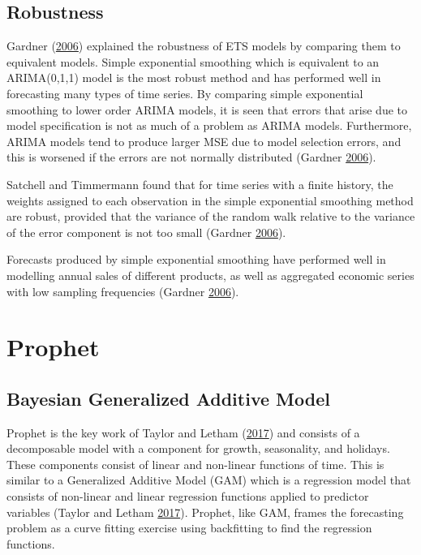 \documentclass[12pt,preprint, authoryear]{elsarticle}
\numberwithin{equation}{section}
\numberwithin{figure}{section}
\numberwithin{table}{section}
\begin{document}
\subsection{Robustness}\label{robustness}

Gardner (\protect\hyperlink{ref-gardner2006exponential}{2006}) explained
the robustness of ETS models by comparing them to equivalent models.
Simple exponential smoothing which is equivalent to an ARIMA(0,1,1)
model is the most robust method and has performed well in forecasting
many types of time series. By comparing simple exponential smoothing to
lower order ARIMA models, it is seen that errors that arise due to model
specification is not as much of a problem as ARIMA models. Furthermore,
ARIMA models tend to produce larger MSE due to model selection errors,
and this is worsened if the errors are not normally distributed (Gardner
\protect\hyperlink{ref-gardner2006exponential}{2006}).

Satchell and Timmermann found that for time series with a finite
history, the weights assigned to each observation in the simple
exponential smoothing method are robust, provided that the variance of
the random walk relative to the variance of the error component is not
too small (Gardner
\protect\hyperlink{ref-gardner2006exponential}{2006}).

Forecasts produced by simple exponential smoothing have performed well
in modelling annual sales of different products, as well as aggregated
economic series with low sampling frequencies (Gardner
\protect\hyperlink{ref-gardner2006exponential}{2006}).

\section{Prophet}\label{prophet}

\subsection{Bayesian Generalized Additive
Model}\label{bayesian-generalized-additive-model}

Prophet is the key work of Taylor and Letham
(\protect\hyperlink{ref-taylor2017forecasting}{2017}) and consists of a
decomposable model with a component for growth, seasonality, and
holidays. These components consist of linear and non-linear functions of
time. This is similar to a Generalized Additive Model (GAM) which is a
regression model that consists of non-linear and linear regression
functions applied to predictor variables (Taylor and Letham
\protect\hyperlink{ref-taylor2017forecasting}{2017}). Prophet, like GAM,
frames the forecasting problem as a curve fitting exercise using
backfitting to find the regression functions.
\end{document}
